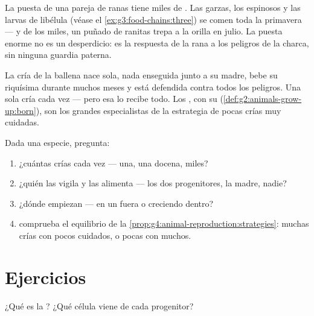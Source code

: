 \begin{example}\label{ex:g4:animal-reproduction:pondcount}
La puesta de una pareja de ranas tiene miles de . Las garzas,
los espinosos y las larvas de libélula (véase el
\cref{ex:g3:food-chains:three}) se comen  toda la primavera
--- y de los miles, un puñado de ranitas trepa a la orilla en julio.
La puesta enorme no es un desperdicio: es la respuesta de la rana a los
peligros de la charca, sin ninguna guardia paterna.
\end{example}

\begin{example}\label{ex:g4:animal-reproduction:whalecalf}
La cría de la ballena nace sola, nada enseguida junto a su madre, bebe
su  riquísima durante muchos meses y está defendida contra todos
los peligros. Una sola cría cada vez --- pero esa lo recibe todo. Los
, con su  (\cref{def:g2:animals-grow-up:born}), son los
grandes especialistas de la estrategia de pocas crías muy cuidadas.
\end{example}

\begin{method}\label{met:g4:animal-reproduction:read}
Dada una especie, pregunta:
\begin{enumerate}
  \item ¿cuántas crías cada vez --- una, una docena, miles?
  \item ¿quién las vigila y las alimenta --- los dos progenitores, la
        madre, nadie?
  \item ¿dónde empiezan --- en un  fuera o creciendo dentro?
  \item comprueba el equilibrio de la
        \cref{prop:g4:animal-reproduction:strategies}: muchas crías
        con pocos cuidados, o pocas con muchos.
\end{enumerate}
\end{method}

\section{Ejercicios}

\begin{exercise}[$\star$]\label{exo:g4:animal-reproduction:1}
¿Qué es la ? ¿Qué célula viene de cada progenitor?
\end{exercise}

